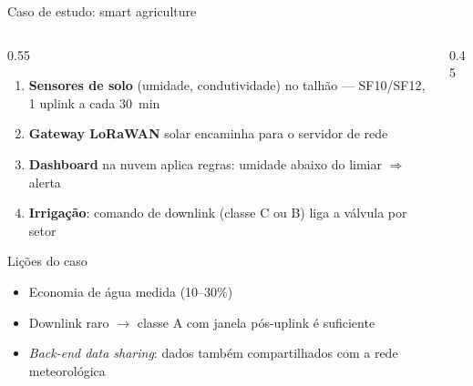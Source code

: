 \documentclass[aspectratio=169,11pt]{beamer}
\begin{document}
\begin{frame}{Caso de estudo: smart agriculture}
  \footnotesize
  \begin{columns}
    \begin{column}{0.55\textwidth}
      \begin{enumerate}
        \item \textbf{Sensores de solo} (umidade, condutividade) no talhão --- SF10/SF12, 1 uplink a cada 30~min
        \item \textbf{Gateway LoRaWAN} solar encaminha para o servidor de rede
        \item \textbf{Dashboard} na nuvem aplica regras: umidade abaixo do limiar $\Rightarrow$ alerta
        \item \textbf{Irrigação}: comando de downlink (classe C ou B) liga a válvula por setor
      \end{enumerate}
      \pause
      \begin{block}{Lições do caso}
        \begin{itemize}
          \item Economia de água medida (10--30\%)
          \item Downlink raro $\rightarrow$ classe A com janela pós-uplink é suficiente
          \item \emph{Back-end data sharing}: dados também compartilhados com a rede meteorológica
        \end{itemize}
      \end{block}
    \end{column}
    \begin{column}{0.45\textwidth}
      \begin{center}
\end{center}
\end{column}
\end{columns}
\end{frame}
\end{document}
